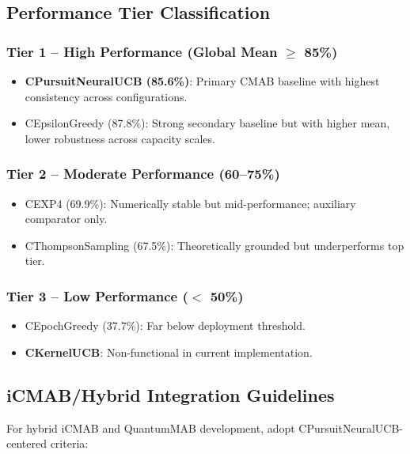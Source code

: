 \documentclass[12pt,a4paper]{article}
\newcommand{\primarytext}[1]{\textcolor{primaryblue}{\textbf{#1}}}
\newcommand{\warning}[1]{\textcolor{warningred}{\textbf{#1}}}
\begin{document}
\subsection{Performance Tier Classification}

\subsubsection{Tier 1 – High Performance (Global Mean $\geq$ 85\%)}
\begin{itemize}
    \item \primarytext{CPursuitNeuralUCB (85.6\%)}: Primary CMAB baseline with highest consistency across configurations.
    \item CEpsilonGreedy (87.8\%): Strong secondary baseline but with higher mean, lower robustness across capacity scales.
\end{itemize}

\subsubsection{Tier 2 – Moderate Performance (60–75\%)}
\begin{itemize}
    \item CEXP4 (69.9\%): Numerically stable but mid-performance; auxiliary comparator only.
    \item CThompsonSampling (67.5\%): Theoretically grounded but underperforms top tier.
\end{itemize}

\subsubsection{Tier 3 – Low Performance ($<$ 50\%)}
\begin{itemize}
    \item CEpochGreedy (37.7\%): Far below deployment threshold.
    \item \warning{CKernelUCB}: Non-functional in current implementation.
\end{itemize}

\subsection{iCMAB/Hybrid Integration Guidelines}

For hybrid iCMAB and QuantumMAB development, adopt CPursuitNeuralUCB-centered criteria:
\end{document}
